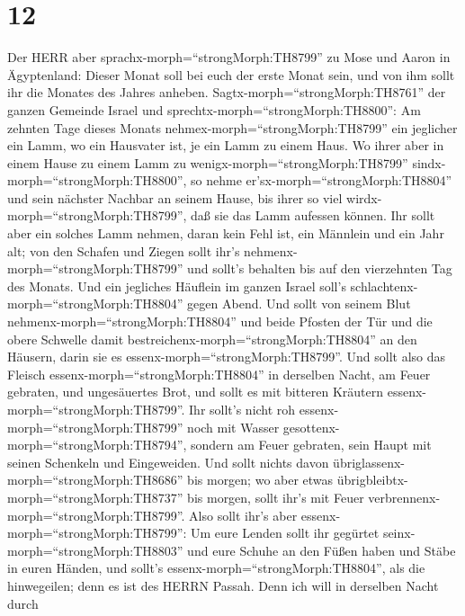 \hypertarget{section-11}{%
\section{12}\label{section-11}}

 Der HERR aber sprachx-morph=``strongMorph:TH8799'' zu Mose
und Aaron in Ägyptenland:  Dieser Monat soll bei euch der
erste Monat sein, und von ihm sollt ihr die Monates des Jahres anheben.
 Sagtx-morph=``strongMorph:TH8761'' der ganzen Gemeinde
Israel und sprechtx-morph=``strongMorph:TH8800'': Am zehnten Tage dieses
Monats nehmex-morph=``strongMorph:TH8799'' ein jeglicher ein Lamm, wo
ein Hausvater ist, je ein Lamm zu einem Haus.  Wo ihrer aber
in einem Hause zu einem Lamm zu wenigx-morph=``strongMorph:TH8799''
sindx-morph=``strongMorph:TH8800'', so nehme
er'sx-morph=``strongMorph:TH8804'' und sein nächster Nachbar an seinem
Hause, bis ihrer so viel wirdx-morph=``strongMorph:TH8799'', daß sie das
Lamm aufessen können.  Ihr sollt aber ein solches Lamm
nehmen, daran kein Fehl ist, ein Männlein und ein Jahr alt; von den
Schafen und Ziegen sollt ihr's nehmenx-morph=``strongMorph:TH8799''
 und sollt's behalten bis auf den vierzehnten Tag des
Monats. Und ein jegliches Häuflein im ganzen Israel soll's
schlachtenx-morph=``strongMorph:TH8804'' gegen Abend.  Und
sollt von seinem Blut nehmenx-morph=``strongMorph:TH8804'' und beide
Pfosten der Tür und die obere Schwelle damit
bestreichenx-morph=``strongMorph:TH8804'' an den Häusern, darin sie es
essenx-morph=``strongMorph:TH8799''.  Und sollt also das
Fleisch essenx-morph=``strongMorph:TH8804'' in derselben Nacht, am Feuer
gebraten, und ungesäuertes Brot, und sollt es mit bitteren Kräutern
essenx-morph=``strongMorph:TH8799''.  Ihr sollt's nicht roh
essenx-morph=``strongMorph:TH8799'' noch mit Wasser
gesottenx-morph=``strongMorph:TH8794'', sondern am Feuer gebraten, sein
Haupt mit seinen Schenkeln und Eingeweiden.  Und sollt
nichts davon übriglassenx-morph=``strongMorph:TH8686'' bis morgen; wo
aber etwas übrigbleibtx-morph=``strongMorph:TH8737'' bis morgen, sollt
ihr's mit Feuer verbrennenx-morph=``strongMorph:TH8799''. 
Also sollt ihr's aber essenx-morph=``strongMorph:TH8799'': Um eure
Lenden sollt ihr gegürtet seinx-morph=``strongMorph:TH8803'' und eure
Schuhe an den Füßen haben und Stäbe in euren Händen, und sollt's
essenx-morph=``strongMorph:TH8804'', als die hinwegeilen; denn es ist
des HERRN Passah.  Denn ich will in derselben Nacht durch
